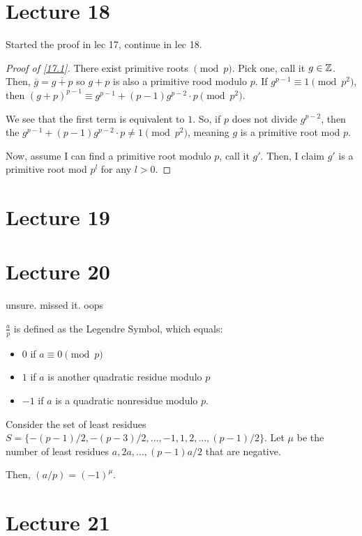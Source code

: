 \documentclass{article}
\begin{document}
\section{Lecture 18}
Started the proof in lec 17, continue in lec 18.
\begin{proof}[Proof of \ref{17.1}]
	There exist primitive roots $\pmod p$. Pick one, call it $g \in \mathbb Z$. Then, $\overline{g} = \overline{g + p}$ so $g + p$ is also a primitive rood modulo $p$. If $g^{p-1} \equiv 1 \pmod{p^2}$, then $(g + p)^{p-1} \equiv g^{p-1} + (p - 1)g^{p-2} \cdot p \pmod{p^2}$.

	We see that the first term is equivalent to $1$. So, if $p$ does not divide $g^{p-2}$, then the $g^{p -1} + (p-1)g^{p-2} \cdot p \neq 1 \pmod{p^2}$, meaning $g$ is a primitive root mod $p$.

	Now, assume I can find a primitive root modulo $p$, call it $g'$. Then, I claim $g'$ is a primitive root mod $p^l$ for any $l > 0$.
\end{proof}

\section{Lecture 19}

\section{Lecture 20}
unsure. missed it. oops

\begin{definition} 
	$\frac{a}{p}$ is defined as the Legendre Symbol, which equals:
	\begin{itemize}
		\item $0$ if $a \equiv 0 \pmod p$
		\item $1$ if $a$ is another quadratic residue modulo $p$
		\item $-1$ if $a$ is a quadratic nonresidue modulo $p$.
	\end{itemize}
\end{definition}

\begin{lemma} 
	Consider the set of least residues $S = \{ -(p-1)/2, -(p-3)/2, \ldots, -1, 1, 2, \ldots, (p-1)/2 \}$. Let $\mu$ be the number of least residues $a, 2a, \ldots, (p-1)a/2$ that are negative.

	Then, $(a / p) = (-1)^{\mu}$. 
\end{lemma}

\section{Lecture 21}
\end{document}
